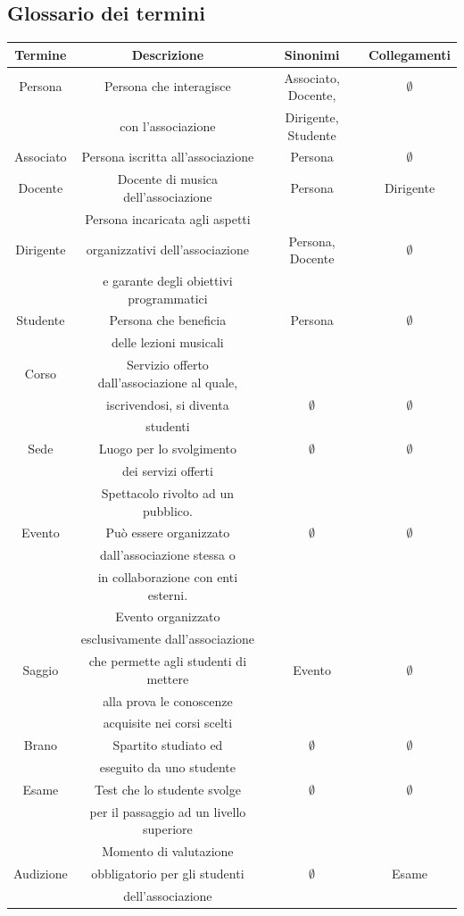 \documentclass[12pt]{article}
\begin{document}
	\subsection{Glossario dei termini}
		\begin{tabular}{c|c|c|c}
			\hline
			Termine & Descrizione & Sinonimi & Collegamenti\\
			\hline
			Persona & Persona che interagisce & Associato, Docente,&$\emptyset$\\
			& con l'associazione & Dirigente, Studente &\\
			\hline
			Associato & Persona iscritta all'associazione & Persona &$\emptyset$ \\
			\hline
			Docente & Docente di musica dell'associazione  & Persona & Dirigente\\
			\hline
			& Persona incaricata agli aspetti & & \\
			Dirigente & organizzativi dell'associazione & Persona, Docente &$\emptyset$ \\
			 & e garante degli obiettivi programmatici && \\
			\hline
			Studente & Persona che beneficia & Persona & $\emptyset$\\
			& delle lezioni musicali & & \\
			\hline
			Corso & Servizio offerto dall'associazione al quale, & &\\
			& iscrivendosi, si diventa&$\emptyset$ &$\emptyset$\\
			& studenti & &\\
			\hline
			Sede & Luogo per lo svolgimento &$\emptyset$ &$\emptyset$\\
			& dei servizi offerti & &\\
			\hline
			& Spettacolo rivolto ad un pubblico.& &\\
			Evento & Può essere organizzato &$\emptyset$ &$\emptyset$\\
			& dall'associazione stessa o & &\\
			& in collaborazione con enti esterni. & &\\
			\hline
			& Evento organizzato& &\\
			& esclusivamente dall'associazione& &\\
			Saggio& che permette agli studenti di mettere& Evento &$\emptyset$\\
			&  alla prova le conoscenze & &\\
			&  acquisite nei corsi scelti & &\\
			\hline
			Brano & Spartito studiato ed &$\emptyset$ &$\emptyset$\\
			& eseguito da uno studente & &\\
			\hline
			Esame & Test che lo studente svolge &$\emptyset$ &$\emptyset$\\
			& per il passaggio ad un livello superiore & &\\
			\hline
			& Momento di valutazione& &\\
			Audizione & obbligatorio per gli studenti&$\emptyset$ & Esame\\
			& dell'associazione & &\\
			\hline
			\end{tabular}
\end{document}
